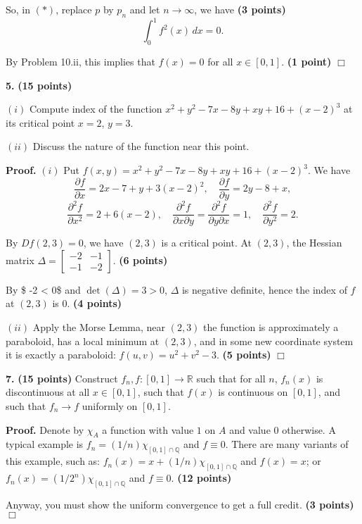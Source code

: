 \documentclass{article}
\begin{document}
So, in $(*)$, replace $p$ by $p_n$ and let $n \to \infty$, we have
\textbf{(3 points)} \[\int_0^1 f^2(x) \,dx = 0.\]

By Problem 10.ii, this implies that $f(x) = 0$ for all $x\in [0,1]$.
\textbf{(1 point)} $\Box$

    \textbf{5.} \textbf{(15 points)}

$(i)$ Compute index of the function
$x^2 + y^2 − 7x − 8y + xy + 16 + (x − 2)^3$ at its critical point
$x = 2$, $y = 3$.

$(ii)$ Discuss the nature of the function near this point.

    \textbf{Proof.} $(i)$ Put
$f(x,y) = x^2 + y^2 − 7x − 8y + xy + 16 + (x − 2)^3$. We have
\[\frac{\partial f}{\partial x} = 2x - 7 + y + 3(x-2)^2,\quad \frac{\partial f}{\partial y} = 2y - 8 + x,\]
\[\frac{\partial^2 f}{\partial x^2} = 2 + 6(x-2),\quad \frac{\partial^2 f}{\partial x\partial y} =  \frac{\partial^2 f}{\partial y\partial x} = 1,\quad \frac{\partial^2 f}{\partial y^2} = 2.\]

By $Df(2,3) = 0$, we have $(2,3)$ is a critical point. At $(2,3)$, the
Hessian matrix
$\Delta = \begin{bmatrix}-2 & -1 \\ -1 & -2 \end{bmatrix}$. \textbf{(6
points)}

By \$ -2 \textless{} 0\$ and $\det (\Delta) = 3 > 0$, $\Delta$ is
negative definite, hence the index of $f$ at $(2,3)$ is $0$. \textbf{(4
points)}

$(ii)$ Apply the Morse Lemma, near $(2,3)$ the function is approximately
a paraboloid, has a local minimum at $(2,3)$, and in some new coordinate
system it is exactly a paraboloid: $f(u,v) = u^2 + v^2 - 3$. \textbf{(5
points)} $\Box$

    \textbf{7.} \textbf{(15 points)} Construct $f_n,f:[0,1] \to \mathbb{R}$
such that for all $n$, $f_n(x)$ is discontinuous at all $x\in [0,1]$,
such that $f(x)$ is continuous on $[0,1]$, and such that $f_n \to f$
uniformly on $[0,1]$.

    \textbf{Proof.} Denote by $\chi_A$ a function with value $1$ on $A$ and
value $0$ otherwise. A typical example is
$f_n = (1/n)\chi_{[0,1] \cap \mathbb{Q}}$ and $f \equiv 0$. There are
many variants of this example, such as:
$f_n(x) = x + (1/n)\chi_{[0,1] \cap \mathbb{Q}}$ and $f(x) = x$; or
$f_n(x) = (1/2^n)\chi_{[0,1] \cap \mathbb{Q}}$ and $f \equiv 0$.
\textbf{(12 points)}

Anyway, you must show the uniform convergence to get a full credit.
\textbf{(3 points)} $\Box$


    
    
    
    
\end{document}

